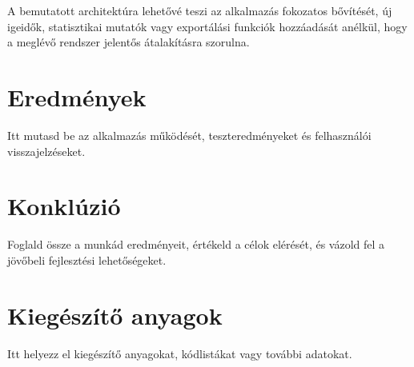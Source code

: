 \documentclass[12pt,a4paper]{report}
\begin{document}
A bemutatott architektúra lehetővé teszi az alkalmazás fokozatos bővítését, új igeidők, statisztikai mutatók vagy exportálási funkciók hozzáadását anélkül, hogy a meglévő rendszer jelentős átalakításra szorulna.

\chapter{Eredmények}
\label{ch:eredmenyek}

Itt mutasd be az alkalmazás működését, teszteredményeket és felhasználói visszajelzéseket.

\chapter{Konklúzió}
\label{ch:konkluzio}

Foglald össze a munkád eredményeit, értékeld a célok elérését, és vázold fel a jövőbeli fejlesztési lehetőségeket.




\appendix
\chapter{Kiegészítő anyagok}
\label{app:kiegeszito}

Itt helyezz el kiegészítő anyagokat, kódlistákat vagy további adatokat.
\end{document}
